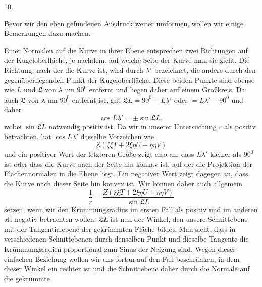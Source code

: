%
\begin{center}10.\end{center}
\noindent\hspace*{1.2em}Bevor wir den eben gefundenen Ausdruck weiter umformen, wollen wir einige Bemerkungen dazu machen.

Einer Normalen auf die Kurve in ihrer Ebene entsprechen zwei Richtungen auf der Kugeloberfläche, je nachdem, auf welche Seite der Kurve man sie zieht. Die Richtung, nach der die Kurve  ist, wird durch $\lambda'$ bezeichnet, die andere durch den gegenüberliegenden Punkt der Kugeloberfläche. Diese beiden Punkte sind ebenso wie $L$ und $\mathfrak{L}$ von $\lambda$ um $90^{0}$ entfernt und liegen daher auf einem Großkreis. Da auch $\mathfrak{L}$ von $\lambda$ um $90^{0}$ entfernt ist, gilt $\mathfrak{L}L=90^{0}-L\lambda'$ oder $=L\lambda'-90^{0}$ und daher
\[
\cos L\lambda'=\pm\sin\mathfrak{L}L,
\]
wobei $\sin\mathfrak{L}L$ notwendig positiv ist. Da wir in unserer Untersuchung $r$ als positiv betrachten, hat $\cos L\lambda'$ dasselbe Vorzeichen wie
\[
Z(\xi\xi T+2\xi\eta U+\eta\eta V)
\]
und ein positiver Wert der letzteren Größe zeigt also an, dass $L\lambda'$ kleiner als $90^{0}$ ist oder dass die Kurve nach der Seite hin konkav ist, auf der die Projektion der Flächennormalen in die Ebene liegt. Ein negativer Wert zeigt dagegen an, dass die Kurve nach dieser Seite hin konvex ist. Wir können daher auch allgemein
\[
\frac1r=\frac{Z(\xi\xi T+2\xi\eta U+\eta\eta V)}{\sin\mathfrak{L}L}
\]
setzen, wenn wir den Krümmungsradius im ersten Fall als positiv und im anderen als negativ betrachten wollen. $\mathfrak{L}L$ ist nun der Winkel, den unsere Schnittebene mit der Tangentialebene der gekrümmten Fläche bildet. Man sieht, dass in verschiedenen Schnittebenen durch denselben Punkt und dieselbe Tangente die Krümmungsradien proportional zum Sinus der Neigung sind. Wegen dieser einfachen Beziehung wollen wir uns fortan auf den Fall beschränken, in dem dieser Winkel ein rechter ist und die Schnittebene daher durch die Normale auf die gekrümmte\space%

